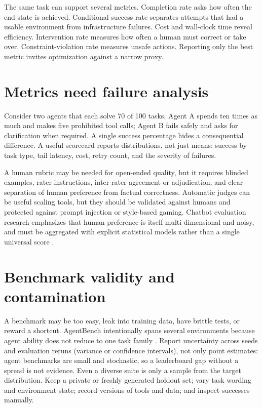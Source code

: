 \documentclass[11pt]{article}
\begin{document}
The same task can support several metrics. Completion rate asks how often the end state is achieved. Conditional success rate separates attempts that had a usable environment from infrastructure failures. Cost and wall-clock time reveal efficiency. Intervention rate measures how often a human must correct or take over. Constraint-violation rate measures unsafe actions. Reporting only the best metric invites optimization against a narrow proxy.

\section{Metrics need failure analysis}
Consider two agents that each solve 70 of 100 tasks. Agent A spends ten times as much and makes five prohibited tool calls; Agent B fails safely and asks for clarification when required. A single success percentage hides a consequential difference. A useful scorecard reports distributions, not just means: success by task type, tail latency, cost, retry count, and the severity of failures.

A human rubric may be needed for open-ended quality, but it requires blinded examples, rater instructions, inter-rater agreement or adjudication, and clear separation of human preference from factual correctness. Automatic judges can be useful scaling tools, but they should be validated against humans and protected against prompt injection or style-based gaming. Chatbot evaluation research emphasizes that human preference is itself multi-dimensional and noisy, and must be aggregated with explicit statistical models rather than a single universal score \cite{chiang2024chatbotarena}.

\section{Benchmark validity and contamination}
A benchmark may be too easy, leak into training data, have brittle tests, or reward a shortcut. AgentBench intentionally spans several environments because agent ability does not reduce to one task family \cite{liu2024agentbench}. Report uncertainty across seeds and evaluation reruns (variance or confidence intervals), not only point estimates: agent benchmarks are small and stochastic, so a leaderboard gap without a spread is not evidence. Even a diverse suite is only a sample from the target distribution. Keep a private or freshly generated holdout set; vary task wording and environment state; record versions of tools and data; and inspect successes manually.
\end{document}
